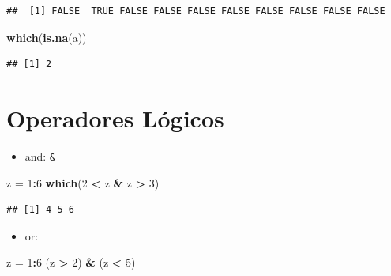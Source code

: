 \documentclass[]{book}
\newenvironment{Shaded}{\begin{snugshade}}{\end{snugshade}}
\newcommand{\KeywordTok}[1]{\textcolor[rgb]{0.13,0.29,0.53}{\textbf{#1}}}
\newcommand{\DecValTok}[1]{\textcolor[rgb]{0.00,0.00,0.81}{#1}}
\newcommand{\StringTok}[1]{\textcolor[rgb]{0.31,0.60,0.02}{#1}}
\newcommand{\OperatorTok}[1]{\textcolor[rgb]{0.81,0.36,0.00}{\textbf{#1}}}
\newcommand{\NormalTok}[1]{#1}
\providecommand{\tightlist}{%
  \setlength{\itemsep}{0pt}\setlength{\parskip}{0pt}}
\begin{document}
\begin{verbatim}
##  [1] FALSE  TRUE FALSE FALSE FALSE FALSE FALSE FALSE FALSE FALSE
\end{verbatim}

\begin{Shaded}
\begin{Highlighting}[]
\KeywordTok{which}\NormalTok{(}\KeywordTok{is.na}\NormalTok{(a))}
\end{Highlighting}
\end{Shaded}

\begin{verbatim}
## [1] 2
\end{verbatim}

\section{Operadores Lógicos}\label{operadores-luxf3gicos}

\begin{itemize}
\tightlist
\item
  and: \texttt{\&}
\end{itemize}

\begin{Shaded}
\begin{Highlighting}[]
\NormalTok{z =}\StringTok{ }\DecValTok{1}\OperatorTok{:}\DecValTok{6}
\KeywordTok{which}\NormalTok{(}\DecValTok{2} \OperatorTok{<}\StringTok{ }\NormalTok{z }\OperatorTok{&}\StringTok{ }\NormalTok{z }\OperatorTok{>}\StringTok{ }\DecValTok{3}\NormalTok{)}
\end{Highlighting}
\end{Shaded}

\begin{verbatim}
## [1] 4 5 6
\end{verbatim}

\begin{itemize}
\tightlist
\item
  or: \texttt{\textbar{}}
\end{itemize}

\begin{Shaded}
\begin{Highlighting}[]
\NormalTok{z =}\StringTok{ }\DecValTok{1}\OperatorTok{:}\DecValTok{6}
\NormalTok{(z }\OperatorTok{>}\StringTok{ }\DecValTok{2}\NormalTok{) }\OperatorTok{&}\StringTok{ }\NormalTok{(z }\OperatorTok{<}\StringTok{ }\DecValTok{5}\NormalTok{)}
\end{Highlighting}
\end{Shaded}
\end{document}
